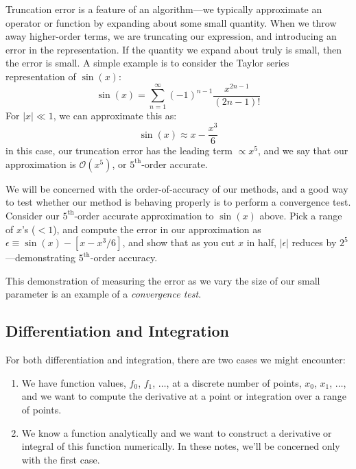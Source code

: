 Truncation error is a feature of an algorithm---we typically
approximate an operator or function by expanding about some small
quantity.  When we throw away higher-order terms, we are truncating
our expression, and introducing an error in the representation.  If
the quantity we expand about truly is small, then the error is small.
A simple example is to consider the Taylor series representation of
$\sin(x)$:
\begin{equation}
\sin(x) = \sum_{n=1}^\infty (-1)^{n-1} \frac{x^{2n-1}}{(2n-1)!} 
\end{equation}
For $|x| \ll 1$, we can approximate this as:
\begin{equation}
\sin(x) \approx x - \frac{x^3}{6}
\end{equation}
in this case, our truncation error has the leading term $\propto x^5$,
and we say that our approximation is $\mathcal{O}(x^5)$, or
$5^\mathrm{th}$-order accurate.

\begin{exercise}
We will be concerned with the order-of-accuracy of our methods, and a
good way to test whether our method is behaving properly is to perform
a convergence test.  Consider our $5^\mathrm{th}$-order accurate
approximation to $\sin(x)$ above.  Pick a range of $x$'s ($< 1$), and
compute the error in our approximation as $\epsilon \equiv \sin(x) - [
  x - x^3/6 ]$, and show that as you cut $x$ in half, $|\epsilon|$
reduces by $2^5$---demonstrating $5^\mathrm{th}$-order accuracy.
\end{exercise}

This demonstration of measuring the error as we vary the size
of our small parameter is an example of a {\em convergence test}.

\subsection{Differentiation and Integration}

For both differentiation and integration, there are two cases we might
encounter:
\begin{enumerate}
\item We have function values, $f_0$, $f_1$, $\ldots$, at a discrete
  number of points, $x_0$, $x_1$, $\ldots$, and we want to compute the
  derivative at a point or integration over a range of points.
\item We know a function analytically and we want to construct a
  derivative or integral of this function numerically.  In these
  notes, we'll be concerned only with the first case.
\end{enumerate}

